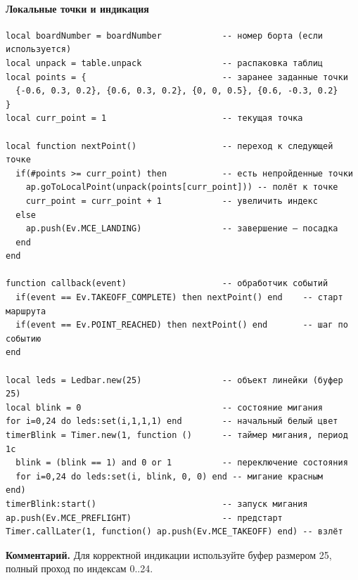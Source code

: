\paragraph{Локальные точки и индикация}
\begin{verbatim}
local boardNumber = boardNumber            -- номер борта (если используется)
local unpack = table.unpack                -- распаковка таблиц
local points = {                           -- заранее заданные точки
  {-0.6, 0.3, 0.2}, {0.6, 0.3, 0.2}, {0, 0, 0.5}, {0.6, -0.3, 0.2}
}
local curr_point = 1                       -- текущая точка

local function nextPoint()                 -- переход к следующей точке
  if(#points >= curr_point) then           -- есть непройденные точки
    ap.goToLocalPoint(unpack(points[curr_point])) -- полёт к точке
    curr_point = curr_point + 1            -- увеличить индекс
  else
    ap.push(Ev.MCE_LANDING)                -- завершение — посадка
  end
end

function callback(event)                   -- обработчик событий
  if(event == Ev.TAKEOFF_COMPLETE) then nextPoint() end    -- старт маршрута
  if(event == Ev.POINT_REACHED) then nextPoint() end       -- шаг по событию
end

local leds = Ledbar.new(25)                -- объект линейки (буфер 25)
local blink = 0                            -- состояние мигания
for i=0,24 do leds:set(i,1,1,1) end        -- начальный белый цвет
timerBlink = Timer.new(1, function ()      -- таймер мигания, период 1с
  blink = (blink == 1) and 0 or 1          -- переключение состояния
  for i=0,24 do leds:set(i, blink, 0, 0) end -- мигание красным
end)
timerBlink:start()                         -- запуск мигания
ap.push(Ev.MCE_PREFLIGHT)                  -- предстарт
Timer.callLater(1, function() ap.push(Ev.MCE_TAKEOFF) end) -- взлёт
\end{verbatim}
\textbf{Комментарий.} Для корректной индикации используйте буфер размером 25, полный проход по индексам 0..24.
